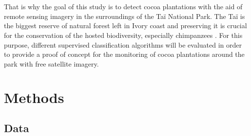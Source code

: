 \documentclass[a4paper, 12pt]{article}
\begin{document}
    \\
    \\
    That is why the goal of this study is to detect cocoa plantations with the aid of remote sensing imagery in the surroundings of the Taï National Park. The Taï is the biggest reserve of natural forest left in Ivory coast and preserving it is crucial for the conservation of the hosted biodiversity, especially chimpanzees \cite{vonk_tai_2018}. For this purpose, different supervised classification algorithms will be evaluated in order to provide a proof of concept for the monitoring of cocoa plantations around the park with free satellite imagery.


\section{Methods}
    \subsection{Data}

        \begin{table}[b!]
            \centering
            \caption{\textbf{Data specifications}}
        \label{tab:data}
        \end{table}
\end{document}
